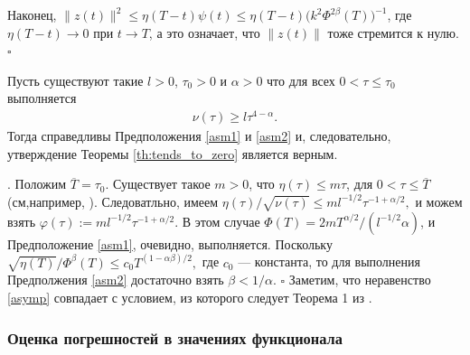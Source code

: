 \documentclass[../main.tex]{subfiles}
\begin{document}
Наконец, $ \|z(t)\|^2 \leqslant \eta(T-t)\psi(t) \leqslant \eta(T-t)\big(k^2\Phi^{2\beta}(T)\big)^{-1} $, 
где $\eta(T-t) \to 0$ при $t \to T$, а это означает, что $\|z(t)\|$ тоже стремится к нулю.
	\hfill $ \square $
\begin{corollary}%
Пусть существуют такие $ l > 0$, $\tau_0 > 0$ и $\alpha > 0$ что для всех $0 < \tau \leqslant \tau_0 $ выполняется
		\begin{gather}\label{asymp}
			\nu(\tau)\geqslant l\tau^{4-\alpha}.
		\end{gather}
 Тогда справедливы Предположения \ref{asm1} и \ref{asm2} и, следовательно, утверждение Теоремы \ref{th:tends_to_zero} является верным.
\end{corollary}
\doc. 
Положим $\overline{T}=\tau_0$. 
Существует такое $m>0$, что $\eta(\tau)\leqslant m \tau$,  для $0 < \tau \leqslant\overline{T}$ (см,например, \cite{GusevOsipov}). 
Следоватльно, имеем $
\eta(\tau)/\sqrt{\nu(\tau)} \leqslant  
	 ml^{-1/2}\tau^{-1+\alpha/2},$
и можем взять  $\varphi(\tau):=  
	 ml^{-1/2}\tau^{-1+\alpha/2}$. 
В этом случае 
$\Phi(T)=2mT^{\alpha/2}/(l^{-1/2}\alpha)$, и Предположение \ref{asm1}, очевидно, выполняется. 
Поскольку 
$\sqrt{\eta(T)}/\Phi^\beta(T) \leqslant c_0T^{(1-\alpha\beta)/2},$
где $c_0$ --- константа, то для выполнения Предполжения  \ref{asm2} достаточно взять $\beta < 1/\alpha$.
	\hfill $ \square $
Заметим, что неравенство \eqref{asymp} совпадает с условием, из которого следует Теорема 1 из \cite{GusevOsipov}.

\subsubsection{Оценка погрешностей в значениях функционала}
\end{document}
